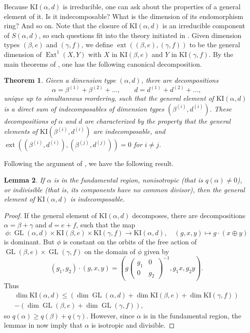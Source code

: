 \documentclass{amsart}
\theoremstyle{plain}
\newtheorem{thm}{Theorem}[section]
\newtheorem{lem}[thm]{Lemma}
\theoremstyle{definition}
\theoremstyle{remark}
\DeclareMathOperator{\GL}{GL}
\DeclareMathOperator{\ext}{ext}
\DeclareMathOperator{\Ext}{Ext}
\begin{document}
Because $\mathrm{KI}(\alpha,d)$ is irreducible, one can ask about the properties of a general
element of it. Is it indecomposable? What is the dimension of its endomorphism ring?
And so on. Note that the closure of $\mathrm{KI}(\alpha,d)$ is an irreducible component
of $S(\alpha,d)$, so such questions fit into the theory initiated in \cite{CBS}.
Given dimension types $(\beta,e)$ and $(\gamma,f)$, we define $\ext((\beta,e),(\gamma,f))$
to be the general dimension of $\Ext^1(X,Y)$ with $X$ in $\mathrm{KI}(\beta,e)$ and
$Y$ in $\mathrm{KI}(\gamma,f)$.
By the main theorems of \cite{CBS}, one has the following canonical decomposition.


\begin{thm}
Given a dimension type $(\alpha,d)$, there are decompositions
\[
\alpha = \beta^{(1)} + \beta^{(2)} + \dots, \qquad d = d^{(1)}+ d^{(2)}+\dots,
\]
unique up to simultaneous reordering, such that the general element of $\mathrm{KI}(\alpha,d)$
is a direct sum of indecomposables of dimension types $(\beta^{(i)},d^{(i)})$.
These decompositions of $\alpha$ and $d$
are characterized by the property that the general
elements of $\mathrm{KI}(\beta^{(i)},d^{(i)})$ are indecomposable, and
$\ext((\beta^{(i)},d^{(i)}),(\beta^{(j)},d^{(j)}))=0$ for $i\neq j$.
\end{thm}


Following the argument of \cite[Theorem 3.3]{KR}, we have the following result.


\begin{lem}
If $\alpha$ is in the fundamental region, nonisotropic \textup{(}that is $q(\alpha)\neq 0$\textup{)},
or indivisible \textup{(}that is, its components have no common divisor\textup{)},
then the general element of $\mathrm{KI}(\alpha,d)$ is indecomposable.
\end{lem}


\begin{proof}
If the general element of $\mathrm{KI}(\alpha,d)$ decomposes, there are
decompositions $\alpha=\beta+\gamma$ and $d=e+f$, such that the map
\[
\phi:\GL(\alpha,d)\times \mathrm{KI}(\beta,e)\times \mathrm{KI}(\gamma,f)\to \mathrm{KI}(\alpha,d),
\quad
(g,x,y)\mapsto g\cdot(x\oplus y)
\]
is dominant. But $\phi$ is constant on the orbits of the free action
of $\GL(\beta,e)\times \GL(\gamma,f)$ on the domain of $\phi$ given by
\[
(g_1,g_2)\cdot(g,x,y) = (g \begin{pmatrix} g_1 & 0 \\ 0 & g_2 \end{pmatrix}^{-1}, g_1 x, g_2 y).
\]
Thus
\[
\begin{split}
\dim \mathrm{KI}(\alpha,d)\le \left(\dim \GL(\alpha,d)+\dim \mathrm{KI}(\beta,e)+\dim \mathrm{KI}(\gamma,f)\right)
\\
-\left(\dim \GL(\beta,e)+\dim \GL(\gamma,f)\right),
\end{split}
\]
so $q(\alpha)\ge q(\beta)+q(\gamma)$. However, since $\alpha$ is in the fundamental region,
the lemmas in \cite[\S 3.1]{KR} now imply that $\alpha$ is isotropic and divisible.
\end{proof}
\end{document}
